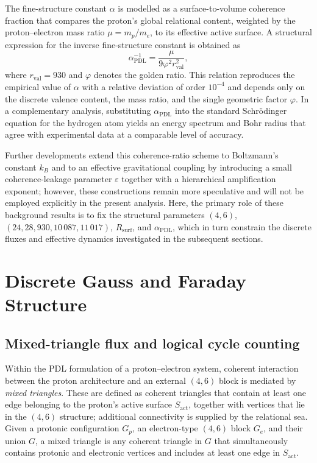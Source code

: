 \documentclass[11pt,a4paper]{article}
\begin{document}
The fine-structure constant $\alpha$ is modelled as a surface-to-volume coherence fraction that compares the proton’s global relational content, weighted by the proton–electron mass ratio $\mu=m_{p}/m_{e}$, to its effective active surface.\cite{Laubscher2026Alpha}
A structural expression for the inverse fine-structure constant is obtained as
\[
\alpha^{-1}_{\mathrm{PDL}} = \frac{\mu}{9\varphi^{2} r_{\mathrm{val}}^{2}},
\]
where $r_{\mathrm{val}}=930$ and $\varphi$ denotes the golden ratio.\cite{Laubscher2026Alpha,Laubscher2026GoldenRatioSurface}
This relation reproduces the empirical value of $\alpha$ with a relative deviation of order $10^{-4}$ and depends only on the discrete valence content, the mass ratio, and the single geometric factor $\varphi$.
In a complementary analysis, substituting $\alpha_{\mathrm{PDL}}$ into the standard Schr\"odinger equation for the hydrogen atom yields an energy spectrum and Bohr radius that agree with experimental data at a comparable level of accuracy.\cite{Laubscher2026SchrodingerPDL}

Further developments extend this coherence-ratio scheme to Boltzmann’s constant $k_{B}$ and to an effective gravitational coupling by introducing a small coherence-leakage parameter $\varepsilon$ together with a hierarchical amplification exponent; however, these constructions remain more speculative and will not be employed explicitly in the present analysis.\cite{Laubscher2026FullPDL,Laubscher2026TopologicalReformulation,Laubscher2026Exponent18}
Here, the primary role of these background results is to fix the structural parameters $(4,6)$, $(24,28,930,10\,087,11\,017)$, $R_{\mathrm{surf}}$, and $\alpha_{\mathrm{PDL}}$, which in turn constrain the discrete fluxes and effective dynamics investigated in the subsequent sections.

\section{Discrete Gauss and Faraday Structure}

\subsection{Mixed-triangle flux and logical cycle counting}

Within the PDL formulation of a proton–electron system, coherent interaction between the proton architecture and an external $(4,6)$ block is mediated by \emph{mixed triangles}. These are defined as coherent triangles that contain at least one edge belonging to the proton’s active surface $S_{\mathrm{act}}$, together with vertices that lie in the $(4,6)$ structure; additional connectivity is supplied by the relational sea.\cite{Laubscher2026FullPDL,Laubscher2026Alpha,Laubscher2026SchrodingerSketch}
Given a protonic configuration $G_{p}$, an electron-type $(4,6)$ block $G_{e}$, and their union $G$, a mixed triangle is any coherent triangle in $G$ that simultaneously contains protonic and electronic vertices and includes at least one edge in $S_{\mathrm{act}}$.
\end{document}
